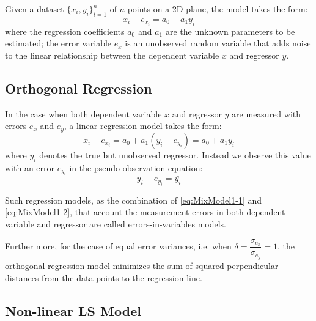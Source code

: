 Given a dataset $\{x_i,y_i\}^n_{i=1}$ of $n$ points on a 2D plane, the model takes the form:
\begin{equation} \label{eq:SimpleLinearRegression}
x_i - e_{x_i} = a_0 + a_1y_i
\end{equation}
where the regression coefficients $a_0$ and $a_1$ are the unknown parameters to be estimated; the error variable $e_x$ is an unobserved random variable that adds noise to the linear relationship between the dependent variable $x$ and regressor $y$.


\subsection{Orthogonal Regression}
\label{subsec:OrthogonalRegression}

In the case when both dependent variable $x$ and regressor $y$ are measured with errors $e_x$ and $e_y$, a linear regression model takes the form:
\begin{equation} \label{eq:MixModel1-1}
x_i - e_{x_i} = a_0 + a_1(y_i-e_{y_i}) = a_0 + a_1\bar{y_i}
\end{equation}
where $\bar{y_i}$ denotes the true but unobserved regressor. Instead we observe this value with an error $e_{y_i}$ in the pseudo observation equation:
\begin{equation} \label{eq:MixModel1-2}
y_i-e_{y_i} = \bar{y_i}
\end{equation}

Such regression models, as the combination of \eqref{eq:MixModel1-1} and \eqref{eq:MixModel1-2}, that account the measurement errors in both dependent variable and regressor are called errors-in-variables models.

Further more, for the case of equal error variances, i.e. when $\delta=\dfrac{\sigma_{e_x}}{\sigma_{e_y}}=1$, the orthogonal regression model minimizes the sum of squared perpendicular distances from the data points to the regression line.


\subsection{Non-linear LS Model}
\label{subsec:NonLinear}

